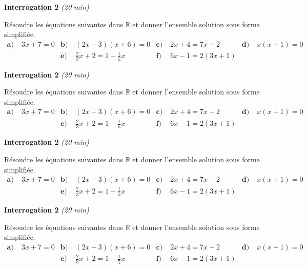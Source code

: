 \documentclass[11pt]{article}
\begin{document}

\begin{center}
  \LARGE
  \textbf{Interrogation 2} \emph{(20 min)}
\end{center}

Résoudre les équations suivantes dans $\mathbb{R}$ et
donner l'ensemble solution sous forme simplifiée.
\begin{align*}
  \textbf{a)}\;& 3x+7 = 0 &
  \textbf{b)}\;& (2x-3)(x+6) = 0 &
  \textbf{c)}\;& 2x+4=7x-2 &
  \textbf{d)}\;& x(x+1) = 0 \\
  & & 
  \textbf{e)}\;& \frac{2}{3}x+2 = 1-\frac{1}{5}x &
  \textbf{f)}\;& 6x-1 = 2(3x+1)
  & & 
\end{align*}
\vspace{2.5cm}
\begin{center}
  \LARGE
  \textbf{Interrogation 2} \emph{(20 min)}
\end{center}

Résoudre les équations suivantes dans $\mathbb{R}$ et
donner l'ensemble solution sous forme simplifiée.
\begin{align*}
  \textbf{a)}\;& 3x+7 = 0 &
  \textbf{b)}\;& (2x-3)(x+6) = 0 &
  \textbf{c)}\;& 2x+4=7x-2 &
  \textbf{d)}\;& x(x+1) = 0 \\
  & & 
  \textbf{e)}\;& \frac{2}{3}x+2 = 1-\frac{1}{5}x &
  \textbf{f)}\;& 6x-1 = 2(3x+1)
  & & 
\end{align*}
\vspace{2.5cm}
\begin{center}
  \LARGE
  \textbf{Interrogation 2} \emph{(20 min)}
\end{center}

Résoudre les équations suivantes dans $\mathbb{R}$ et
donner l'ensemble solution sous forme simplifiée.
\begin{align*}
  \textbf{a)}\;& 3x+7 = 0 &
  \textbf{b)}\;& (2x-3)(x+6) = 0 &
  \textbf{c)}\;& 2x+4=7x-2 &
  \textbf{d)}\;& x(x+1) = 0 \\
  & & 
  \textbf{e)}\;& \frac{2}{3}x+2 = 1-\frac{1}{5}x &
  \textbf{f)}\;& 6x-1 = 2(3x+1)
  & & 
\end{align*}
\vspace{2.5cm}
\begin{center}
  \LARGE
  \textbf{Interrogation 2} \emph{(20 min)}
\end{center}

Résoudre les équations suivantes dans $\mathbb{R}$ et
donner l'ensemble solution sous forme simplifiée.
\begin{align*}
  \textbf{a)}\;& 3x+7 = 0 &
  \textbf{b)}\;& (2x-3)(x+6) = 0 &
  \textbf{c)}\;& 2x+4=7x-2 &
  \textbf{d)}\;& x(x+1) = 0 \\
  & & 
  \textbf{e)}\;& \frac{2}{3}x+2 = 1-\frac{1}{5}x &
  \textbf{f)}\;& 6x-1 = 2(3x+1)
  & & 
\end{align*}
\end{document}
